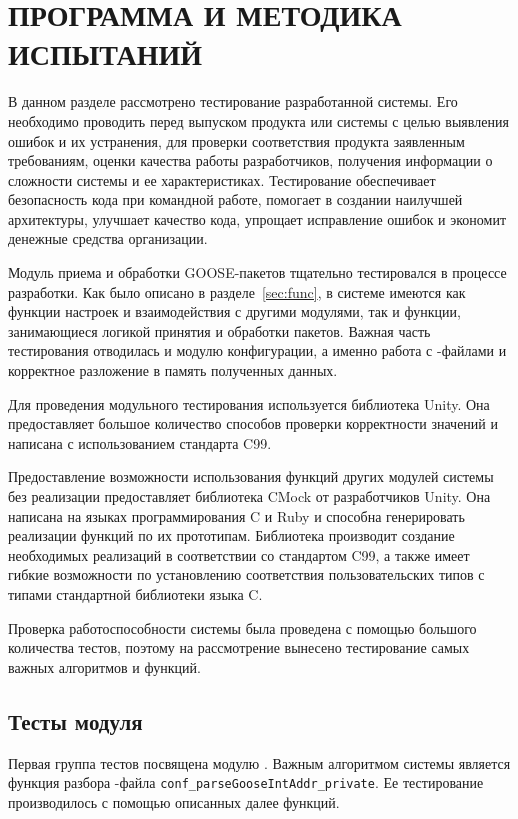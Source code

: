 \section{ПРОГРАММА И МЕТОДИКА ИСПЫТАНИЙ}
\label{sec:testing}

В данном разделе рассмотрено тестирование разработанной системы.
Его необходимо проводить перед выпуском продукта или системы
с целью выявления ошибок и их устранения, для проверки соответствия продукта
заявленным требованиям, оценки качества работы разработчиков,
получения информации о сложности системы и ее характеристиках. Тестирование
обеспечивает безопасность кода при командной работе, помогает в создании наилучшей
архитектуры, улучшает качество кода, упрощает исправление ошибок и экономит денежные
средства организации.

Модуль приема и обработки GOOSE-пакетов тщательно тестировался в процессе разработки.
Как было описано в разделе~\ref{sec:func}, в системе имеются как функции настроек
и взаимодействия с другими модулями, так и функции, занимающиеся логикой принятия и
обработки пакетов. Важная часть тестирования отводилась и модулю конфигурации, а именно
работа с \cid-файлами и корректное разложение в память полученных данных.

Для проведения модульного тестирования используется библиотека Unity. Она предоставляет
большое количество способов проверки корректности значений и написана с использованием
стандарта C99.

Предоставление возможности использования функций других модулей системы без реализации
предоставляет библиотека CMock от разработчиков Unity. Она написана на языках программирования
C и Ruby и способна генерировать реализации функций по их прототипам. Библиотека
производит создание необходимых реализаций в соответствии со
стандартом C99, а также имеет гибкие
возможности по установлению соответствия пользовательских типов с типами стандартной библиотеки
языка C.

Проверка работоспособности системы была проведена с помощью большого количества тестов, поэтому на рассмотрение вынесено тестирование самых важных алгоритмов и функций.

\subsection{Тесты модуля \moduleCfg}

Первая группа тестов посвящена модулю \moduleCfg. Важным алгоритмом системы является
функция разбора \cid-файла \lstinline{conf_parseGooseIntAddr_private}.
Ее тестирование производилось с помощью описанных далее функций.


